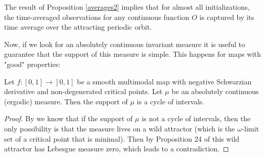 \documentclass[format=acmsmall, authorversion, screen=true]{acmart}
\def\R{\ensuremath{\mathbb{R}}}
\begin{document}
The result of Proposition \ref{averages2} implies that for almost all initializations, the time-averaged
observations for any continuous function $O$ is captured by its time average over the attracting periodic orbit.

Now, if we look for an absolutely continuous invariant measure it is useful to guarantee that the support of this measure is simple. This happens for maps with "good" properties:

\begin{proposition}
\label{lem:supcycle}
    Let $f\colon [0,1]\to [0,1]$ be a smooth multimodal map with negative Schwarzian derivative and non-degenerated critical points. Let $\mu$ be an absolutely continuous (ergodic) measure. Then the support of $\mu$ is a cycle of intervals.
\end{proposition}
\begin{proof}
  By \cite{blokh1990decomposition} we know that if the support of $\mu$ is not a cycle of intervals, then the only possibility is that the measure lives on a wild attractor (which is the $\omega$-limit set of a critical point that is minimal). Then by Proposition 24 of \cite{bruin2010lebesgue} this wild attractor has Lebesgue measure zero, which leads to a contradiction.
\end{proof}

\end{document}

